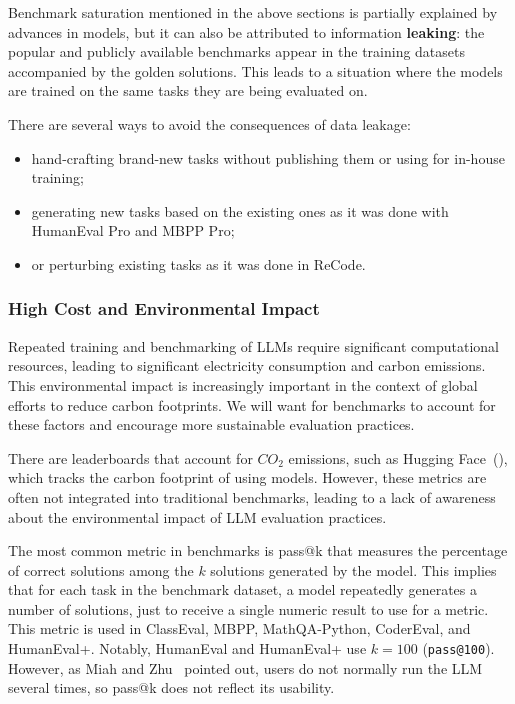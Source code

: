 Benchmark saturation mentioned in the above sections is partially explained by advances in models, but it can also be attributed to information \textbf{leaking}: the popular and publicly available benchmarks appear in the training datasets accompanied by the golden solutions.
This leads to a situation where the models are trained on the same tasks they are being evaluated on.

There are several ways to avoid the consequences of data leakage:
\begin{itemize}
    \item hand-crafting brand-new tasks without publishing them or using for in-house training;
    \item generating new tasks based on the existing ones as it was done with HumanEval Pro and MBPP Pro;
    \item or perturbing existing tasks as it was done in ReCode.
\end{itemize}

\subsubsection{High Cost and Environmental Impact}

Repeated training and benchmarking of LLMs require significant computational resources, leading to significant electricity consumption and carbon emissions. This environmental impact is increasingly important in the context of global efforts to reduce carbon footprints.
We will want for benchmarks to account for these factors and encourage more sustainable evaluation practices.

There are leaderboards that account for $CO_2$ emissions, such as Hugging Face~(\cite{huggingfaceCalculation}), which tracks the carbon footprint of using models. However, these metrics are often not integrated into traditional benchmarks, leading to a lack of awareness about the environmental impact of LLM evaluation practices.

The most common metric in benchmarks is pass@k that measures the percentage of correct solutions among the $k$ solutions generated by the model.
This implies that for each task in the benchmark dataset, a model repeatedly generates a number of solutions, just to receive a single numeric result to use for a metric.
This metric is used in ClassEval, MBPP, MathQA-Python, CoderEval, and HumanEval+.
Notably, HumanEval and HumanEval+ use $k=100$ (\texttt{pass@100}).
However, as Miah and Zhu~\cite{miah2024usercentricevaluationcode} pointed out, users do not normally run the LLM several times, so pass@k does not reflect its usability.

